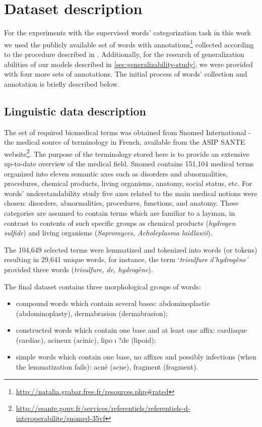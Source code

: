 \chapter{Dataset description}
\label{ch:dataset-description}

For the experiments with the supervised words' categorization task in this work we used the publicly available set of words with annotations\footnote{\url{http://natalia.grabar.free.fr/resources.php#rated}} collected according to the procedure described in \cite{Grabar-PITR2014}. Additionally, for the research of generalization abilities of our models described in \ref{sec:generalizability-study}, we were provided with four more sets of annotations.
The initial process of words' collection and annotation is briefly described below.

\section{Linguistic data description}
\label{sec:linguistic-data-description}

The set of required biomedical terms was obtained from Snomed International \citep{Cote-93} - the medical source of terminology in French, available from the ASIP SANTE website\footnote{\url{http://esante.gouv.fr/services/referentiels/referentiels-d-interoperabilite/snomed-35vf}}. The purpose of the terminology stored here is to provide an extensive up-to-date overview of the medical field. Snomed contains 151,104 medical terms organized into eleven semantic axes such as disorders and abnormalities, procedures, chemical products, living organisms, anatomy, social status, etc. For words' understandability study five axes related to the main medical notions were chosen: disorders, abnormalities, procedures, functions, and anatomy. These categories are assumed to contain terms which are familiar to a layman, in contrast to contents of such specific groups as chemical products (\textit{hydrogen sulfide}) and living organisms (\textit{Sapromyces, Acholeplasma laidlawii}).

The 104,649 selected terms were lemmatized and tokenized into words (or tokens) resulting in 29,641 unique words, for instance, the term `\textit{trisulfure d'hydrog\`{e}ne'} provided three words (\textit{trisulfure, de, hydrog\`{e}ne}).

The final dataset contains three morphological groups of words:
\begin{itemize}
    \item  compound words which contain several bases: abdominoplastie (abdominoplasty), dermabrasion (dermabrasion);
    \item  constructed words which contain one base and at least one affix: cardiaque (cardiac), acineux (acinic), lipo$\mathrm{\imath}$?de (lipoid);
    \item  simple words which contain one base, no affixes and possibly infections (when the lemmatization fails): acn\'{e} (acne), fragment (fragment).
\end{itemize}

